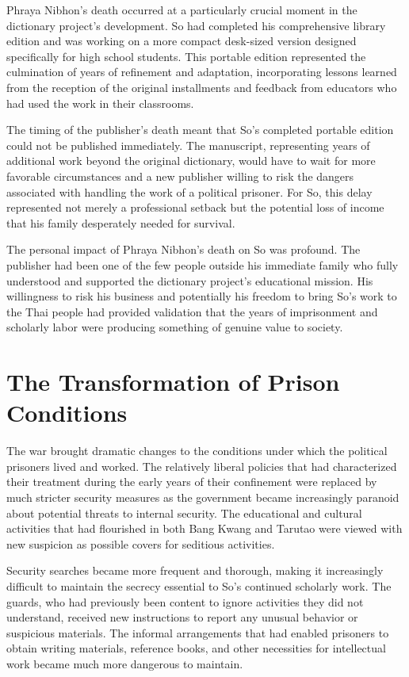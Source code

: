 \documentclass[
  Letterpaper,
]{scrbook}
\begin{document}
Phraya Nibhon's death occurred at a particularly crucial moment in the
dictionary project's development. So had completed his comprehensive
library edition and was working on a more compact desk-sized version
designed specifically for high school students. This portable edition
represented the culmination of years of refinement and adaptation,
incorporating lessons learned from the reception of the original
installments and feedback from educators who had used the work in their
classrooms.

The timing of the publisher's death meant that So's completed portable
edition could not be published immediately. The manuscript, representing
years of additional work beyond the original dictionary, would have to
wait for more favorable circumstances and a new publisher willing to
risk the dangers associated with handling the work of a political
prisoner. For So, this delay represented not merely a professional
setback but the potential loss of income that his family desperately
needed for survival.

The personal impact of Phraya Nibhon's death on So was profound. The
publisher had been one of the few people outside his immediate family
who fully understood and supported the dictionary project's educational
mission. His willingness to risk his business and potentially his
freedom to bring So's work to the Thai people had provided validation
that the years of imprisonment and scholarly labor were producing
something of genuine value to society.

\section{The Transformation of Prison
Conditions}\label{the-transformation-of-prison-conditions}

The war brought dramatic changes to the conditions under which the
political prisoners lived and worked. The relatively liberal policies
that had characterized their treatment during the early years of their
confinement were replaced by much stricter security measures as the
government became increasingly paranoid about potential threats to
internal security. The educational and cultural activities that had
flourished in both Bang Kwang and Tarutao were viewed with new suspicion
as possible covers for seditious activities.

Security searches became more frequent and thorough, making it
increasingly difficult to maintain the secrecy essential to So's
continued scholarly work. The guards, who had previously been content to
ignore activities they did not understand, received new instructions to
report any unusual behavior or suspicious materials. The informal
arrangements that had enabled prisoners to obtain writing materials,
reference books, and other necessities for intellectual work became much
more dangerous to maintain.
\end{document}
